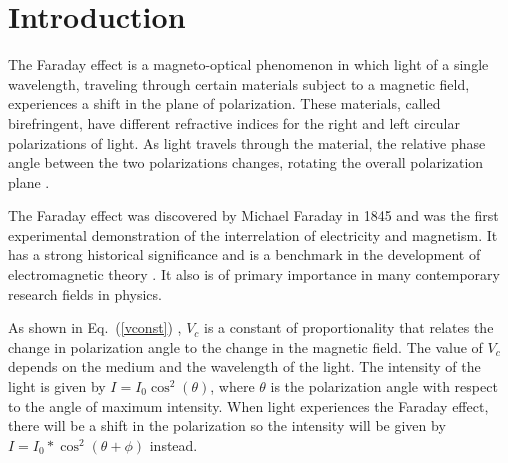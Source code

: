 \documentclass[prb,preprint]{revtex4-1}
\begin{document}
\section{Introduction} 

{The Faraday effect is a magneto-optical phenomenon in which light of a single wavelength, traveling through certain materials subject to a magnetic field, experiences a shift in the plane of polarization. These materials, called birefringent, have different refractive indices for the right and left circular polarizations of light. As light travels through the material, the relative phase angle between the two polarizations changes, rotating the overall polarization plane \cite{melissinos}.  

The Faraday effect was discovered by Michael Faraday in 1845 and was the first experimental demonstration of the interrelation of electricity and magnetism.  It has a strong historical significance and is a benchmark in the development of electromagnetic theory \cite{melissinos}.  It also is of primary importance in many contemporary research fields in physics.    


As shown in Eq.~(\ref{vconst}) , $V_{c}$ is a constant of proportionality that relates the change in polarization angle to the change in the magnetic field.\cite{expphysics} The value of $V_{c}$ depends on the medium and the wavelength of the light. The intensity of the light is given by $I=I_{0}\cos^{2}(\theta)$, where $\theta$ is the polarization angle with respect to the angle of  maximum intensity. When light experiences the Faraday effect, there will be a shift in the polarization so the intensity will be given by $I=I_{0}*\cos^{2}(\theta+\phi)$ instead.
}
\end{document}
